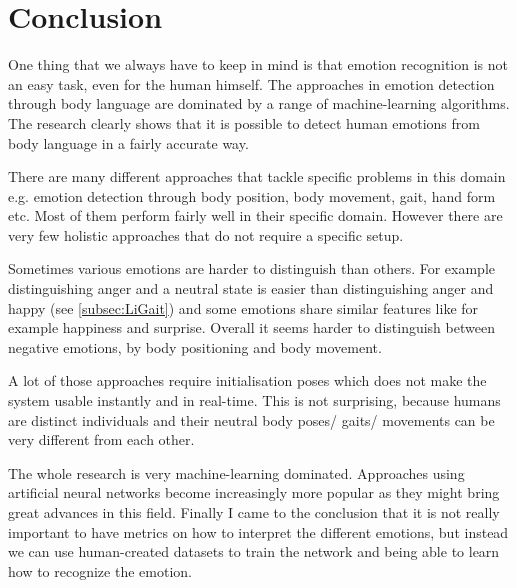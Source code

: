 \documentclass[conference]{IEEEtran}
\begin{document}
\section{Conclusion}
One thing that we always have to keep in mind is that emotion recognition is not an easy task, even for the human himself\cite{ekman1974detecting,karg2012pattern,schindler2008recognizing}. The approaches in emotion detection through body language are dominated by a range of machine-learning algorithms. The research clearly shows that it is possible to detect human emotions from body language in a fairly accurate way.

There are many different approaches that tackle specific problems in this domain e.g. emotion detection through body position, body movement, gait, hand form etc. Most of them perform fairly well in their specific domain. However there are very few holistic approaches that do not require a specific setup.

Sometimes various emotions are harder to distinguish than others. For example distinguishing anger and a neutral state is easier than distinguishing anger and happy\cite{li2016emotion} (see \autoref{subsec:LiGait}) and some emotions share similar features like for example happiness and surprise\cite{kleinsmith2005incremental}. Overall it seems harder to distinguish between negative emotions, by body positioning and body movement\cite{schindler2008recognizing}. 

A lot of those approaches require initialisation poses\cite{li2016emotion,cui2016emotion,mccoll2012affect,singh2015edbl} which does not make the system usable instantly and in real-time. This is not surprising, because humans are distinct individuals and their neutral body poses/ gaits/ movements can be very different from each other.\

The whole research is very machine-learning dominated. Approaches using artificial neural networks become increasingly more popular\cite{cao2017realtime} as they might bring great advances in this field. Finally I came to the conclusion that it is not really important to have metrics on how to interpret the different emotions, but instead we can use human-created datasets to train the network and being able to learn how to recognize the emotion.




\end{document}
